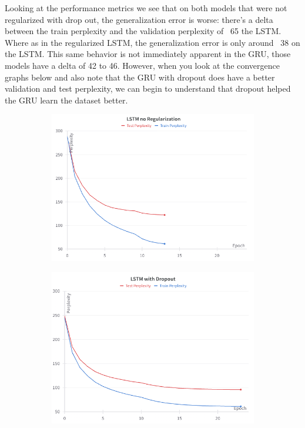 \documentclass{article}
\begin{document}
Looking at the performance metrics we see that on both models that were not regularized with drop out, the generalization error is worse: there's a delta between the train perplexity and the validation perplexity of ~65 the LSTM. Where as in the regularized LSTM, the generalization error is only around ~38 on the LSTM. This same behavior is not immediately apparent in the GRU, those models have a delta of 42 to 46. However, when you look at the convergence graphs below and also note that the GRU with dropout does have a better validation and test perplexity, we can begin to understand that dropout helped the GRU learn the dataset better.



\begin{figure}[ht] %
    \centering

    \caption{Convergence Graphs of Models}
    \label{fig:Convergence}

    \begin{subfigure}[b]{0.45\textwidth}
        \centering
        \includegraphics[width=\linewidth]{../src/lstm_noreg.png}
    \end{subfigure}
    \hfill
    \begin{subfigure}[b]{0.45\textwidth}
        \centering
        \includegraphics[width=\linewidth]{../src/lstm_drop.png}
    \end{subfigure}
    

\end{figure}
\end{document}

